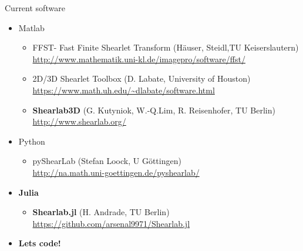 \begin{frame}{Current software}
\begin{itemize}
\item{Matlab}
\begin{itemize}
	\item FFST- Fast Finite Shearlet Transform (H\"auser, Steidl,TU Keiserslautern)\\ \url{http://www.mathematik.uni-kl.de/imagepro/software/ffst/}
	\item 2D/3D Shearlet Toolbox (D. Labate, University of Houston)\\ \url{https://www.math.uh.edu/~dlabate/software.html}
	\item \textbf{Shearlab3D} (G. Kutyniok, W.-Q.Lim, R. Reisenhofer, TU Berlin)\\\url{http://www.shearlab.org/}
\end{itemize}

\item{Python}
\begin{itemize}
	\item pyShearLab (Stefan Loock, U G\"ottingen) \\ \url{http://na.math.uni-goettingen.de/pyshearlab/}
\end{itemize}

\item{\textbf{Julia}}
\begin{itemize}
\item \textbf{Shearlab.jl} (H. Andrade, TU Berlin) \\ \url{https://github.com/arsenal9971/Shearlab.jl}
\end{itemize}

\pause

\item \textbf{Lets code!}
\end{itemize}
\end{frame}



